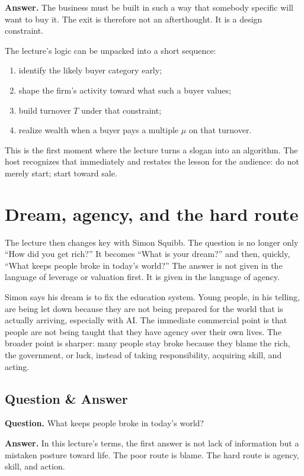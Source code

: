 \textbf{Answer.} The business must be built in such a way that somebody specific will want to buy it. The exit is therefore not an afterthought. It is a design constraint.

The lecture's logic can be unpacked into a short sequence:
\begin{enumerate}
\item identify the likely buyer category early;
\item shape the firm's activity toward what such a buyer values;
\item build turnover \(T\) under that constraint;
\item realize wealth when a buyer pays a multiple \(\mu\) on that turnover.
\end{enumerate}

This is the first moment where the lecture turns a slogan into an algorithm. The host recognizes that immediately and restates the lesson for the audience: do not merely start; start toward sale.

\section{Dream, agency, and the hard route}

The lecture then changes key with Simon Squibb. The question is no longer only ``How did you get rich?'' It becomes ``What is your dream?'' and then, quickly, ``What keeps people broke in today's world?'' The answer is not given in the language of leverage or valuation first. It is given in the language of agency.

Simon says his dream is to fix the education system. Young people, in his telling, are being let down because they are not being prepared for the world that is actually arriving, especially with AI. The immediate commercial point is that people are not being taught that they have agency over their own lives. The broader point is sharper: many people stay broke because they blame the rich, the government, or luck, instead of taking responsibility, acquiring skill, and acting.

\subsection{Question \& Answer}

\textbf{Question.} What keeps people broke in today's world?

\textbf{Answer.} In this lecture's terms, the first answer is not lack of information but a mistaken posture toward life. The poor route is blame. The hard route is agency, skill, and action.


